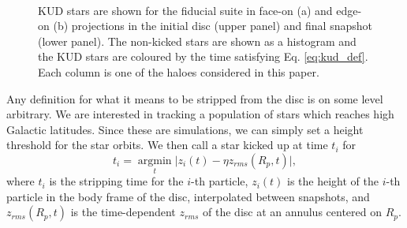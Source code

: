 \begin{figure}
    \centering
  	\\
	 \caption{KUD stars are shown for the fiducial suite in face-on (a) and edge-on (b) projections in the initial disc (upper panel) and final snapshot (lower panel). The non-kicked stars are shown as a histogram and the KUD stars are coloured by the time satisfying Eq. \ref{eq:kud_def}. Each column is one of the haloes considered in this paper.}
	\label{fig:kud_stars_final_ics}
\end{figure}
Any definition for what it means to be stripped from the disc is on some level arbitrary. We are interested in tracking a population of stars which reaches high Galactic latitudes. Since these are simulations, we can simply set a height threshold for the star orbits. We then call a star kicked up at time $t_i$ for
\begin{equation}
t_{i} = \underset{t}{\operatorname{argmin}} \vert z_i(t) - \eta z_{rms}(R_p,t) \vert, \label{eq:kud_def}
\end{equation}
where $t_{i}$ is the stripping time for the $i$-th particle, $z_i(t)$ is the height of the $i$-th particle in the body frame of the disc, interpolated between snapshots, and $z_{rms}(R_p,t)$ is the time-dependent $z_{rms}$ of the disc at an annulus centered on $R_p$. 



